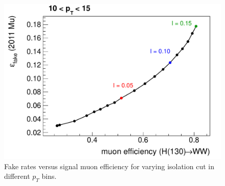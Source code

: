 \begin{figure}[!htbp]
\begin{center}
\includegraphics[scale=0.4]{figures/isoscan2.pdf}
\caption{Fake rates versus signal muon efficiency for varying isolation cut in different $p_T$ bins.}
\label{fig:isoscan}
\end{center}
\end{figure}

